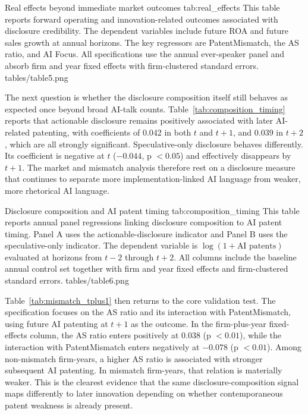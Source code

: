 \tablepdf
{Real effects beyond immediate market outcomes}
{tab:real_effects}
{This table reports forward operating and innovation-related outcomes associated with disclosure credibility. The dependent variables include future ROA and future sales growth at annual horizons. The key regressors are PatentMismatch, the AS ratio, and AI Focus. All specifications use the annual ever-speaker panel and absorb firm and year fixed effects with firm-clustered standard errors.}
{tables/table5.png}

The next question is whether the disclosure composition itself still behaves as expected once  beyond broad AI-talk counts. Table~\ref{tab:composition_timing} reports that actionable disclosure remains positively associated with later AI-related patenting, with coefficients of 0.042 in both $t$ and $t+1$, and 0.039 in $t+2$, which are all strongly significant. Speculative-only disclosure behaves differently. Its coefficient is negative at $t$ ($-0.044$, p $< 0.05$) and effectively disappears by $t+1$. The market and mismatch analysis therefore rest on a disclosure measure that continues to separate more implementation-linked AI language from weaker, more rhetorical AI language.

\tablepdf
{Disclosure composition and AI patent timing}
{tab:composition_timing}
{This table reports annual panel regressions linking disclosure composition to AI patent timing. Panel A uses the actionable-disclosure indicator and Panel B uses the speculative-only indicator. The dependent variable is $\log(1+\text{AI patents})$ evaluated at horizons from $t-2$ through $t+2$. All columns include the baseline annual control set together with firm and year fixed effects and firm-clustered standard errors.}
{tables/table6.png}

Table~\ref{tab:mismatch_tplus1} then returns to the core validation test. The specification focuses on the AS ratio and its interaction with PatentMismatch, using future AI patenting at $t+1$ as the outcome. In the firm-plus-year fixed-effects column, the AS ratio enters positively at 0.038 (p $< 0.01$), while the interaction with PatentMismatch enters negatively at $-0.078$ (p $< 0.01$). Among non-mismatch firm-years, a higher AS ratio is associated with stronger subsequent AI patenting. In mismatch firm-years, that relation is materially weaker. This is the clearest evidence that the same disclosure-composition signal maps differently to later innovation depending on whether contemporaneous patent weakness is already present.

